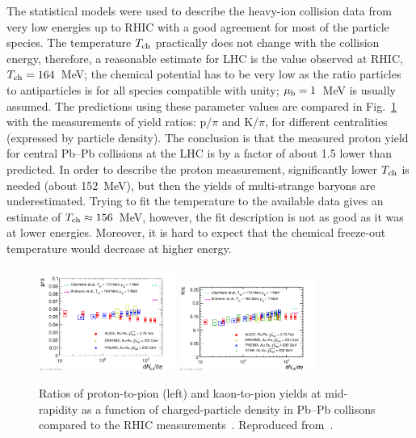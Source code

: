 The statistical models were used to describe the heavy-ion collision data from very low energies up to RHIC with a good agreement for most of the particle species. The temperature $T_{\rm ch}$ practically does not change with the collision energy, therefore, a reasonable estimate for LHC is the value observed at RHIC, $T_{\rm ch} = 164$~MeV; the chemical potential has to be very low as the ratio particles to antiparticles is for all species compatible with unity; $\mu_{\rm b} = 1$~MeV is usually assumed. The predictions using these parameter values are compared in Fig.~\ref{figks:YieldProtonKaon} with the measurements of yield ratios: p$/\pi$ and K$/\pi$, for different centralities (expressed by particle density). The conclusion is that the measured proton yield for central Pb--Pb collisions at the LHC is by a factor of about 1.5 lower than predicted. In order to describe the proton measurement, significantly lower $T_{\rm ch}$ is needed (about 152~MeV), but then the yields of multi-strange baryons are underestimated. Trying to fit the temperature to the available data gives an estimate of $T_{\rm ch} \approx 156$~MeV, however, the fit description is not as good as it was at lower energies. Moreover, it is hard to expect that the chemical freeze-out temperature would decrease at higher energy.

\begin{figure}
\centering
\includegraphics[width=0.4\textwidth]{ksfigures/YieldProtonToPion.pdf}
\includegraphics[width=0.4\textwidth]{ksfigures/YieldKaonToPion.pdf}
\caption{Ratios of proton-to-pion (left) and kaon-to-pion yields at mid-rapidity as a function of charged-particle density in Pb--Pb collisons compared to the RHIC measurements~\cite{Abelev:2008ab,Bearden:2001qq,Adler:2003cb}. Reproduced from~\cite{Abelev:2013vea}.}
\label{figks:YieldProtonKaon}
\end{figure}



